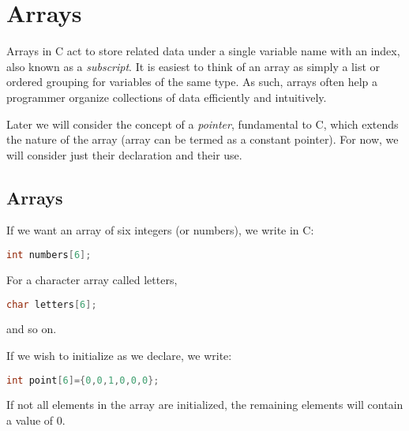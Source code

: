 \section{Arrays}
Arrays in C act to store related data under a single variable name with an
index, also known as a \emph{subscript}. It is easiest to think of an array as
simply a list or ordered grouping for variables of the same type. As such,
arrays often help a programmer organize collections of data efficiently and
intuitively.

Later we will consider the concept of a \emph{pointer}, fundamental to C, which
extends the nature of the array (array can be termed as a constant pointer).
For now, we will consider just their declaration and their use.

\subsection{Arrays}
If we want an array of six integers (or numbers), we write in C:
\lstset{basicstyle=\scriptsize, numbers=left, captionpos=b, tabsize=4}
\begin{lstlisting}[caption=Section \thesection listing \arabic{arraycnt},language={C},
breaklines=true,xleftmargin=15pt,label=lst:Section \thesection listing \arabic{arraycnt}]
int numbers[6];
\end{lstlisting}

For a character array called letters,
\lstset{basicstyle=\scriptsize, numbers=left, captionpos=b, tabsize=4}
\begin{lstlisting}[caption=Section \thesection listing \arabic{arraycnt},language={C},
breaklines=true,xleftmargin=15pt,label=lst:section\thesection listing \arabic{arraycnt}]
char letters[6];
\end{lstlisting}

and so on.

If we wish to initialize as we declare, we write:
\lstset{basicstyle=\scriptsize, numbers=left, captionpos=b, tabsize=4}
\begin{lstlisting}[caption=Section \thesection listing \arabic{arraycnt},language={C},
breaklines=true,xleftmargin=15pt,label=lst:section\thesection listing\arabic{arraycnt}]
int point[6]={0,0,1,0,0,0};
\end{lstlisting}

If not all elements in the array are initialized, the remaining elements will
contain a value of 0.

